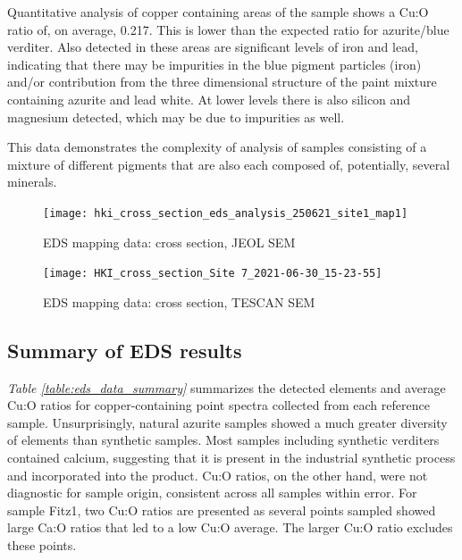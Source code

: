 Quantitative analysis of copper containing areas of the sample shows a Cu:O ratio of, on average, 0.217. This is lower than the expected ratio for azurite/blue verditer. Also detected in these areas are significant levels of iron and lead, indicating that there may be impurities in the blue pigment particles (iron) and/or contribution from the three dimensional structure of the paint mixture containing azurite and lead white. At lower levels there is also silicon and magnesium detected, which may be due to impurities as well. 

This data demonstrates the complexity of analysis of samples consisting of a mixture of different pigments that are also each composed of, potentially, several minerals.



\begin{figure}[H]
\centering
  \texttt{[image: hki\_cross\_section\_eds\_analysis\_250621\_site1\_map1]}
\caption[EDS mapping data: cross section, JEOL SEM]{EDS mapping data: cross section, JEOL SEM}
\label{fig:xsection_map1}
\end{figure}

\begin{figure}[H]
\centering
  \texttt{[image: HKI\_cross\_section\_Site 7\_2021-06-30\_15-23-55]}
\caption[EDS mapping data: cross section, TESCAN SEM]{EDS mapping data: cross section, TESCAN SEM}
\label{fig:xsection_map2}
\end{figure}

\subsection[Summary of EDS results]{Summary of EDS results}

\textit{Table \ref{table:eds_data_summary}} summarizes the detected elements and average Cu:O ratios for copper-containing point spectra collected from each reference sample. Unsurprisingly, natural azurite samples showed a much greater diversity of elements than synthetic samples. Most samples including synthetic verditers contained calcium, suggesting that it is present in the industrial synthetic process and incorporated into the product. Cu:O ratios, on the other hand, were not diagnostic for sample origin, consistent across all samples within error. For sample Fitz1, two Cu:O ratios are presented as several points sampled showed large Ca:O ratios that led to a low Cu:O average. The larger Cu:O ratio excludes these points.

